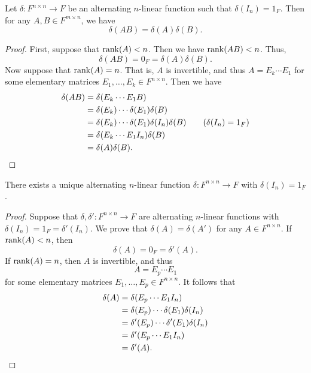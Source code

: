 \begin{theorem}
  Let $\delta: F^{n \times n} \to F$ be an alternating $n$-linear function
  such that $\delta(I_n) = 1_F$.
  Then for any $A, B \in F^{m \times n}$, we have
  \begin{equation*}
    \delta(AB) = \delta(A)\delta(B).
  \end{equation*}
\end{theorem}
\begin{proof}
  First, suppose that $\operatorname{rank}(A) < n$.
  Then we have $\operatorname{rank}(AB) < n$.
  Thus,
  \begin{equation*}
    \delta(AB) = 0_F = \delta(A)\delta(B).
  \end{equation*}
  Now suppose that $\operatorname{rank}(A) = n$.
  That is, $A$ is invertible, and thus $A = E_k \cdots E_1$ for some elementary
  matrices $E_1, \dots, E_k \in F^{n \times n}$.
  Then we have
  \begin{align*}
    \delta(AB)
    &= \delta(E_k \cdots E_1B) \\
    &= \delta(E_k) \cdots \delta(E_1)\delta(B) \\
    &= \delta(E_k) \cdots \delta(E_1)\delta(I_n)\delta(B)
       \tag{$\delta(I_n) = 1_F$} \\
    &= \delta(E_k \cdots E_1I_n)\delta(B) \\
    &= \delta(A)\delta(B).
    \qedhere
  \end{align*}
\end{proof}

\begin{theorem}
  \label{thm:determinant-uniqueness}
  There exists a unique alternating $n$-linear function
  $\delta: F^{n \times n} \to F$ with $\delta(I_n) = 1_F$.
\end{theorem}
\begin{proof}
  Suppose that $\delta, \delta': F^{n \times n} \to F$ are alternating
  $n$-linear functions with $\delta(I_n) = 1_F = \delta'(I_n)$.
  We prove that $\delta(A) = \delta(A')$ for any $A \in F^{n \times n}$.
  If $\operatorname{rank}(A) < n$, then
  \begin{equation*}
    \delta(A) = 0_F = \delta'(A).
  \end{equation*}
  If $\operatorname{rank}(A) = n$, then $A$ is invertible, and thus
  \begin{equation*}
    A = E_p \cdots E_1
  \end{equation*}
  for some elementary matrices $E_1, \dots, E_p \in F^{n \times n}$.
  It follows that
  \begin{align*}
    \delta(A)
    &= \delta(E_p \cdots E_1I_n) \\
    &= \delta(E_p)\cdots\delta(E_1)\delta(I_n) \\
    &= \delta'(E_p)\cdots\delta'(E_1)\delta(I_n) \\
    &= \delta'(E_p \cdots E_1I_n) \\
    &= \delta'(A).
    \qedhere
  \end{align*}
\end{proof}

